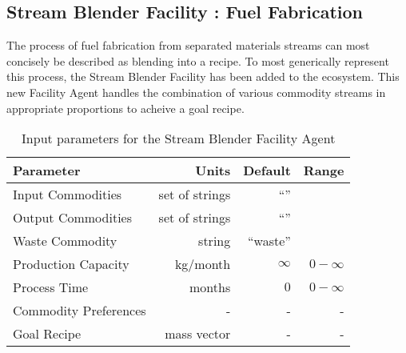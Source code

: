 \subsection{Stream Blender Facility : Fuel Fabrication}

The process of fuel fabrication from separated materials streams can most
concisely be described as blending into a recipe. To most generically represent
this process, the Stream Blender Facility has been added to the \Cyclus 
ecosystem.  This new Facility Agent handles the combination of various 
commodity streams in appropriate proportions to acheive a goal recipe.  

\begin{table}[h!]
\centering
\begin{tabular}{|l|r|r|r|}
\hline
\textbf{Parameter} & \textbf{Units} & \textbf{Default} & \textbf{Range}\\
\hline
Input Commodities & set of strings& ``''& \\
Output Commodities & set of strings&``'' & \\
Waste Commodity & string & ``waste'' & \\
Production Capacity& kg/month& $\infty$& $0-\infty$\\
Process Time& months & $0$ & $0-\infty$ \\
Commodity Preferences& - & - & - \\
Goal Recipe& mass vector & - & -  \\
\hline
\end{tabular}
\caption{Input parameters for the Stream Blender Facility Agent}
\label{tab:commodconverter}
\end{table}
